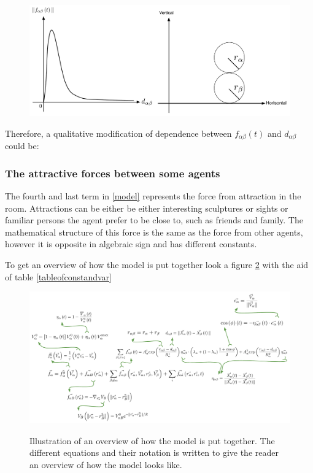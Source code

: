 \begin{figure}[ht]   
\centering
    {\includegraphics[scale=0.35]{Figures/ForceOverlapping.pdf}} 
    \caption{}
    \label{forceoverlapping}
\end{figure}

Therefore, a qualitative modification of dependence between $ f_{\alpha\beta}(t) $ and $ d_{\alpha\beta} $ could be:


\subsubsection{The attractive forces between some agents}
The fourth and last term in \eqref{model} represents the force from attraction 
in the room. Attractions can be either be either interesting sculptures or 
sights or familiar persons the agent prefer to be close to, such as friends 
and family. The mathematical structure of this force is the same as the force 
from other agents, however it is opposite in algebraic sign and has different 
constants. 

To get an overview of how the model is put together look a figure \ref{overview}
with the aid of table \ref{tableofconstandvar}

\begin{figure}[hb] %
    \centering
    {\includegraphics[scale=0.45]{Figures/overview.pdf}} 
    \caption[Overview of the model]{Illustration of an overview of how the model is put together. The different equations and their notation is written to give the 
	     reader an overview of how the model looks like.}
    \label{overview}
\end{figure}
\clearpage
